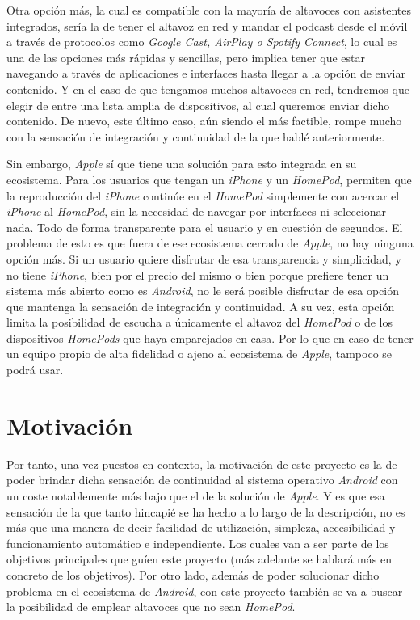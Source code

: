 Otra opción más, la cual es compatible con la mayoría de altavoces con
asistentes integrados, sería la de tener el altavoz en red y mandar el podcast
desde el móvil a través de protocolos como \emph{Google Cast, AirPlay o Spotify
Connect}, lo cual es una de las opciones más rápidas y sencillas, pero implica
tener que estar navegando a través de aplicaciones e interfaces hasta llegar a
la opción de enviar contenido. Y en el caso de que tengamos muchos altavoces en
red, tendremos que elegir de entre una lista amplia de dispositivos, al cual
queremos enviar dicho contenido. De nuevo, este último caso, aún siendo el más
factible, rompe mucho con la sensación de integración y continuidad de la que
hablé anteriormente. 

Sin embargo, \emph{Apple} sí que tiene una solución para esto integrada en su
ecosistema. Para los usuarios que tengan un \emph{iPhone} y un \emph{HomePod},
permiten que la reproducción del \emph{iPhone} continúe en el \emph{HomePod}
simplemente con acercar el \emph{iPhone} al \emph{HomePod}, sin la necesidad de
navegar por interfaces ni seleccionar nada. Todo de forma transparente para el
usuario y en cuestión de segundos. El problema de esto es que fuera de ese
ecosistema cerrado de \emph{Apple}, no hay ninguna opción más. Si un usuario
quiere disfrutar de esa transparencia y simplicidad, y no tiene \emph{iPhone},
bien por el precio del mismo o bien porque prefiere tener un sistema más abierto
como es \emph{Android}, no le será posible disfrutar de esa opción que mantenga
la sensación de integración y continuidad. A su vez, esta opción limita la
posibilidad de escucha a únicamente el altavoz del \emph{HomePod} o de los
dispositivos \emph{HomePods} que haya emparejados en casa. Por lo que en caso de
tener un equipo propio de alta fidelidad o ajeno al ecosistema de \emph{Apple},
tampoco se podrá usar.\\

\section{Motivación}
Por tanto, una vez puestos en contexto, la motivación de este proyecto es la de
poder brindar dicha sensación de continuidad al sistema operativo \emph{Android}
con un coste notablemente más bajo que el de la solución de \emph{Apple}. Y es
que esa sensación de la que tanto hincapié se ha hecho a lo largo de la
descripción, no es más que una manera de decir facilidad de utilización,
simpleza, accesibilidad y funcionamiento automático e independiente. Los cuales
van a ser parte de los objetivos principales que guíen este proyecto (más
adelante se hablará más en concreto de los objetivos). Por otro lado, además de
poder solucionar dicho problema en el ecosistema de \emph{Android}, con este
proyecto también se va a buscar la posibilidad de emplear altavoces que no sean
\emph{HomePod}. 

